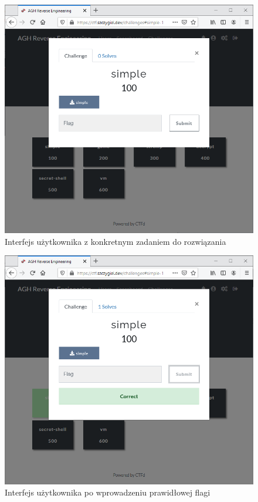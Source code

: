 \documentclass[language=polish,type=eng]{aghmodern}
\begin{document}
\begin{appendices}
\begin{figure}[H]
\centering
\includegraphics[width=\textwidth]{ui_download}
\caption{Interfejs użytkownika z konkretnym zadaniem do rozwiązania}
\end{figure}

\begin{figure}[H]
\centering
\includegraphics[width=\textwidth]{ui_solved}
\caption{Interfejs użytkownika po wprowadzeniu prawidłowej flagi}
\end{figure}


\end{appendices}
\end{document}
